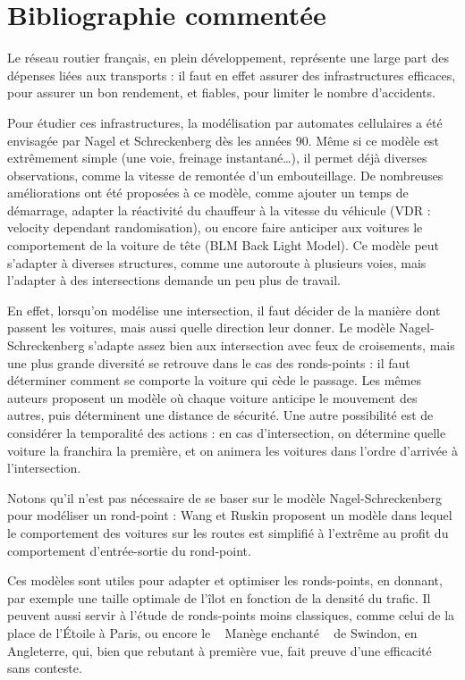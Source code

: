 \documentclass[11pt,a4paper,french]{article}
\begin{document}
\section*{Bibliographie commentée}
Le réseau routier français, en plein développement, représente une large part des dépenses liées aux transports : il faut en effet assurer des infrastructures efficaces, pour assurer un bon rendement, et fiables, pour limiter le nombre d'accidents\cite{dlab}.\par
Pour étudier ces infrastructures, la modélisation par automates cellulaires a été envisagée par Nagel et Schreckenberg dès les années 90\cite{NaSch}. Même si ce modèle est extrêmement simple (une voie, freinage instantané\dots), il permet déjà diverses observations, comme la vitesse de remontée d'un embouteillage. De nombreuses améliorations ont été proposées à ce modèle, comme ajouter un temps de démarrage, adapter la réactivité du chauffeur à la vitesse du véhicule (VDR : velocity dependant randomisation), ou encore faire anticiper aux voitures le comportement de la voiture de tête (BLM Back Light Model)\cite{AppSan}. Ce modèle peut s'adapter à diverses structures, comme une autoroute à plusieurs voies\cite{WhNeEs}, mais l'adapter à des intersections demande un peu plus de travail. \par
En effet, lorsqu'on modélise une intersection, il faut décider de la manière dont passent les voitures, mais aussi quelle direction leur donner. Le modèle Nagel-Schreckenberg s'adapte assez bien aux intersection avec feux de croisements\cite{posstur}, mais une plus grande diversité se retrouve dans le cas des ronds-points : il faut déterminer comment se comporte la voiture qui cède le passage. Les mêmes auteurs proposent un modèle où chaque voiture anticipe le mouvement des autres, puis déterminent une distance de sécurité\cite{tflr}. Une autre possibilité est de considérer la temporalité des actions : en cas d'intersection, on détermine quelle voiture la franchira la première, et on animera les voitures dans l'ordre d'arrivée à l'intersection\cite{ChPh}. \par
Notons qu'il n'est pas nécessaire de se baser sur le modèle Nagel-Schreckenberg pour modéliser un rond-point : Wang et Ruskin proposent un modèle dans lequel le comportement des voitures sur les routes est simplifié à l'extrême au profit du comportement d'entrée-sortie du rond-point\cite{wang2002modeling}. \par
Ces modèles sont utiles pour adapter et optimiser les ronds-points, en donnant, par exemple une taille optimale de l'îlot en fonction de la densité du trafic\cite{tflr}. Il peuvent aussi servir à l'étude de ronds-points moins classiques, comme celui de la place de l'Étoile à Paris, ou encore le \guillemotleft ~ Manège enchanté \guillemotright ~ de Swindon, en Angleterre, qui, bien que rebutant à première vue, fait preuve d'une efficacité sans conteste\cite{cbrd}.
\end{document}
